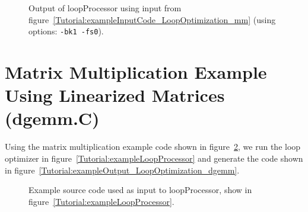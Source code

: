 \begin{figure}[!h]
{\indent
{\mySmallFontSize


\begin{latexonly}
   
\end{latexonly}

\begin{htmlonly}
   
\end{htmlonly}

}
}
\caption{Output of loopProcessor using input from figure~\ref{Tutorial:exampleInputCode_LoopOptimization_mm}
    (using options: {\tt -bk1 -fs0}).}
\label{Tutorial:exampleOutput_LoopOptimization_mm}
\end{figure}


\section{Matrix Multiplication Example Using Linearized Matrices (dgemm.C)}

   Using the matrix multiplication example code shown in 
figure~\ref{Tutorial:exampleInputCode_LoopOptimization_dgemm}, we run the loop optimizer in
figure~\ref{Tutorial:exampleLoopProcessor} and generate the code shown in 
figure~\ref{Tutorial:exampleOutput_LoopOptimization_dgemm}.

\begin{figure}[!h]
{\indent
{\mySmallFontSize


\begin{latexonly}
   
\end{latexonly}

\begin{htmlonly}
   
\end{htmlonly}

}
}
\caption{Example source code used as input to loopProcessor, show in figure~\ref{Tutorial:exampleLoopProcessor}.}
\label{Tutorial:exampleInputCode_LoopOptimization_dgemm}
\end{figure}

